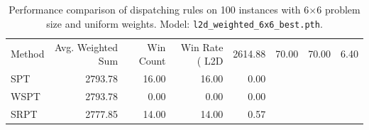 \begin{table}[ht]
\centering
\begin{tabular}{lrrrr}
\toprule
Method & Avg. Weighted Sum & Win Count & Win Rate (%
\midrule
L2D & 2614.88 & 70.00 & 70.00 & 6.40 \\
SPT & 2793.78 & 16.00 & 16.00 & 0.00 \\
WSPT & 2793.78 & 0.00 & 0.00 & 0.00 \\
SRPT & 2777.85 & 14.00 & 14.00 & 0.57
\bottomrule
\end{tabular}
\caption{Performance comparison of dispatching rules on 100 instances 
with 6$\times$6 problem size and uniform weights. 
Model: \texttt{l2d_weighted_6x6_best.pth}.}
\label{tab:results_6x6_uniform}
\end{table}
